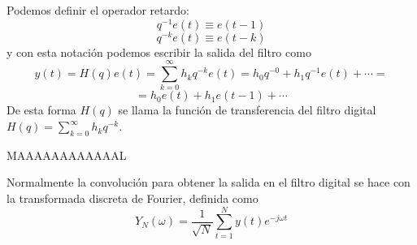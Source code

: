 \begin{nota}
Podemos definir el operador retardo:
\[	q^{-1}e(t) \equiv e(t-1)	\]
\[	q^{-k}e(t) \equiv e(t-k)	\]
y con esta notación podemos escribir la salida del filtro como
\[	y(t) = H(q)e(t) = \sum_{k=0}^{\infty} h_k q^{-k} e(t) = h_0q^{-0}+h_1q^{-1}e(t)+ \cdots = \]
\[ = h_0e(t) + h_1e(t-1) + \cdots	\]
De esta forma $H(q)$ se llama la función de transferencia del filtro digital $H(q) = \sum_{k=0}^{\infty} h_k q^{-k}$.
\end{nota}

MAAAAAAAAAAAAL

Normalmente la convolución para obtener la salida en el filtro digital se hace con la transformada discreta de Fourier, definida como
\[ Y_N(\omega) = \frac{1}{\sqrt{N}} \sum_{t=1}^N y(t) e^{-j \omega t}	\]



%